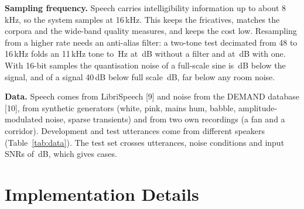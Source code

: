 \documentclass[11pt,a4paper]{article}
\numberwithin{figure}{section}
\numberwithin{table}{section}
\numberwithin{equation}{section}
\newcommand{\dB}{\,dB}
\begin{document}
\textbf{Sampling frequency.} Speech carries intelligibility information up to about 8\,kHz, so the
system samples at 16\,kHz. This keeps the fricatives, matches the corpora and the wide-band quality
measures, and keeps the cost low. Resampling from a higher rate needs an anti-alias filter: a
two-tone test decimated from 48 to 16\,kHz folds an 11\,kHz tone to \valAliasHz\,Hz at
\valAliasNaive\dB{} without a filter and at \valAliasFiltered\dB{} with one. With 16-bit samples the
quantisation noise of a full-scale sine is \valSqnrSixteen\dB{} below the signal, and of a signal
40\dB{} below full scale \valSqnrSixteenQuiet\dB, far below any room noise.

\textbf{Data.} Speech comes from LibriSpeech [9] and noise from the DEMAND database [10], from synthetic
generators (white, pink, mains hum, babble, amplitude-modulated noise, sparse transients) and from
two own recordings (a fan and a corridor). Development and test utterances come from different
speakers (Table~\ref{tab:data}). The test set crosses \valNUtt{} utterances, \valNNoise{} noise
conditions and input SNRs of \valSnrGrid\,dB, which gives \valNCases{} cases.

\begin{table}[htbp]
\centering
\small

\caption{Speech used for tuning and for testing.}
\label{tab:data}
\end{table}

\section{Implementation Details}
\end{document}
